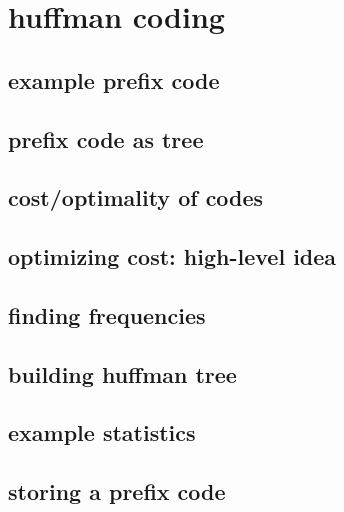 \section{huffman coding}

\subsection{example prefix code}

\subsection{prefix code as tree}

\subsection{cost/optimality of codes}

\subsection{optimizing cost: high-level idea}


\subsection{finding frequencies}


\subsection{building huffman tree}



\subsection{example statistics}

\subsection{storing a prefix code}

